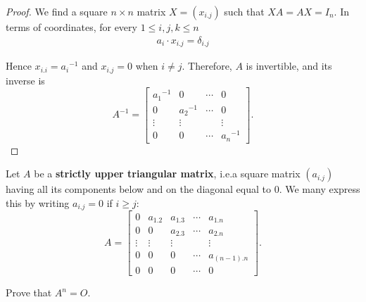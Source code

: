 \begin{proof}
    We find a square $n\times n$ matrix $X = (x_{i.j})$ such that $XA = AX = I_{n}$. In terms of coordinates, for every $1\le i,j,k\le n$
    \[
        \begin{split}
            a_{i}\cdot x_{i.j} = \delta_{i.j}
        \end{split}
    \]

    Hence $x_{i.i} = {a_{i}}^{-1}$ and $x_{i.j} = 0$ when $i\ne j$. Therefore, $A$ is invertible, and its inverse is
    \[
        A^{-1} = \begin{bmatrix}
            {a_{1}}^{-1} & 0            & \cdots & 0            \\
            0            & {a_{2}}^{-1} & \cdots & 0            \\
            \vdots       & \vdots       &        & \vdots       \\
            0            & 0            & \cdots & {a_{n}}^{-1}
        \end{bmatrix}.
    \]
\end{proof}

\begin{exercise}
    Let $A$ be a \textbf{strictly upper triangular matrix}, i.e.\@ a square matrix $(a_{i.j})$ having all its components below and on the diagonal equal to $0$. We many express this by writing $a_{i.j} = 0$ if $i\geq j$:
    \[
        A = \begin{bmatrix}
            0      & a_{1.2} & a_{1.3} & \cdots & a_{1.n}     \\
            0      & 0       & a_{2.3} & \cdots & a_{2.n}     \\
            \vdots & \vdots  & \vdots  &        & \vdots      \\
            0      & 0       & 0       & \cdots & a_{(n-1).n} \\
            0      & 0       & 0       & \cdots & 0
        \end{bmatrix}.
    \]

    Prove that $A^{n} = O$.
\end{exercise}

